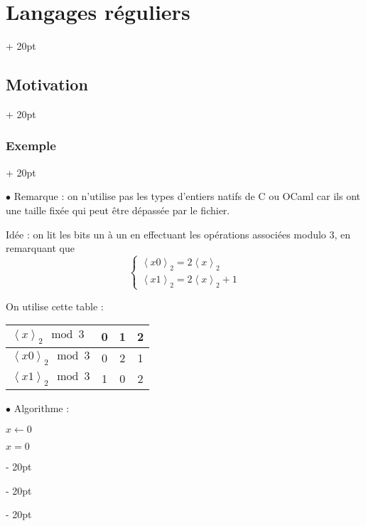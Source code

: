 \documentclass[a4paper, 12pt, twoside]{article}
\newenvironment{indalgo}[2][H]{
    \begin{minipage}{\linewidth-\leftskip-5pt}
        \begin{algorithm}[#1]
            \caption{#2}
}
{
        \end{algorithm}
    \end{minipage}
}
\newcommand{\lrangle}[1]{\left\langle #1 \right\rangle}
\newcommand{\ind}[1][20pt]{\advance\leftskip + #1}
\newcommand{\deind}[1][20pt]{\advance\leftskip - #1}
\newenvironment{indt}[2][20pt]{#2 \par \ind[#1]}{\par \deind} %
\begin{document}
\begin{indt}{\section{Langages réguliers}}
\begin{indt}{\subsection{Motivation}}
\begin{indt}{\subsubsection{Exemple}}
                \vspace{6pt}
                
                $\bullet$ Remarque : on n'utilise pas les types d'entiers natifs de C ou OCaml car ils ont une taille fixée qui peut être dépassée par le fichier.

                \vspace{6pt}
                
                Idée : on lit les bits un à un en effectuant les opérations associées modulo 3, en remarquant que
                \[
                    \begin{cases}
                        \lrangle{x 0}_2 = 2\lrangle x _2
                        \\
                        \lrangle{x 1}_2 = 2\lrangle x _2 + 1
                    \end{cases}
                \]

                On utilise cette table :

                \begin{center}
                    \begin{tabular}{|l|c|c|c|}
                        \hline
                        $\lrangle x _2 \mod 3$ & 0 & 1 & 2
                        \\
                        \hline
                        $\lrangle{x 0}_2 \mod 3$ & 0 & 2 & 1
                        \\
                        \hline
                        $\lrangle{x 1}_2 \mod 3$ & 1 & 0 & 2
                        \\
                        \hline
                    \end{tabular}
                \end{center}

                $\bullet$ Algorithme :

                \begin{indalgo}{}
                    $x \gets 0$\;


                    \KwRet $x = 0$\;
                \end{indalgo}


\end{indt}
\end{indt}
\end{indt}
\end{document}
